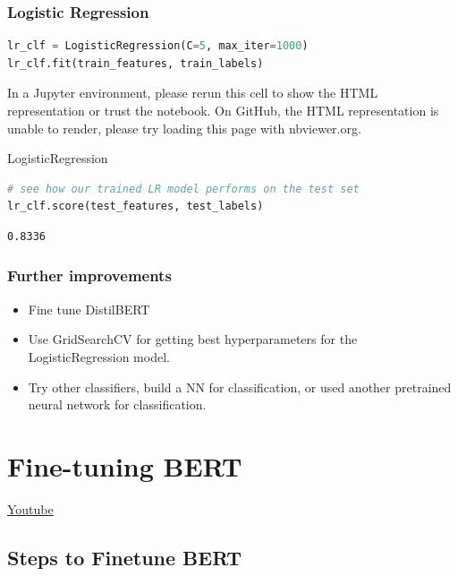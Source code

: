 \subsubsection{Logistic Regression}\label{logistic-regression}

\begin{lstlisting}[language=Python]
lr_clf = LogisticRegression(C=5, max_iter=1000)
lr_clf.fit(train_features, train_labels)
\end{lstlisting}

\label{sk-container-id-1}
In a Jupyter environment, please rerun this cell to show the HTML
representation or trust the notebook. On GitHub, the HTML representation
is unable to render, please try loading this page with nbviewer.org.

LogisticRegression

\begin{lstlisting}[language=Python]
# see how our trained LR model performs on the test set
lr_clf.score(test_features, test_labels)
\end{lstlisting}

\begin{lstlisting}
0.8336
\end{lstlisting}

\subsubsection{Further improvements}\label{further-improvements}

\begin{itemize}
\item Fine tune DistilBERT
\item  Use GridSearchCV for getting best hyperparameters for the
  LogisticRegression model.
\item  Try other classifiers, build a NN for classification, or used another
  pretrained neural network for classification.
\end{itemize}

\section{Fine-tuning BERT}
\href{https://www.youtube.com/watch?v=FyOtgrF8w_w}{Youtube}

\subsection{Steps to Finetune BERT}

